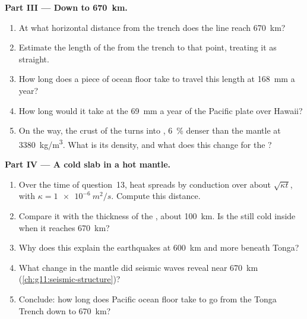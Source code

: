 \begin{problem}
\medskip
\noindent\textbf{Part III --- Down to \qty{670}{km}.}
\begin{enumerate}[resume]
  \item At what horizontal distance from the trench does the line reach
        \qty{670}{km}?
  \item Estimate the length of the  from the trench to that point,
        treating it as straight.
  \item How long does a piece of ocean floor take to travel this length at
        \qty{168}{mm} a year?
  \item How long would it take at the \qty{69}{mm} a year of the Pacific
        plate over Hawaii?
  \item On the way, the crust of the  turns into ,
        \qty{6}{\percent} denser than the mantle at \qty{3380}{kg/m^3}. What
        is its density, and what does this change for the ?
\end{enumerate}

\medskip
\noindent\textbf{Part IV --- A cold slab in a hot mantle.}
\begin{enumerate}[resume]
  \item Over the time of question~13, heat spreads by conduction over about
        $\sqrt{\kappa t}$, with $\kappa = \qty{1e-6}{m^2/s}$. Compute this
        distance.
  \item Compare it with the thickness of the , about \qty{100}{km}. Is
        the  still cold inside when it reaches \qty{670}{km}?
  \item Why does this explain the earthquakes at \qty{600}{km} and more
        beneath Tonga?
  \item What change in the mantle did seismic waves reveal near
        \qty{670}{km} (\cref{ch:g11:seismic-structure})?
  \item Conclude: how long does Pacific ocean floor take to go from the Tonga
        Trench down to \qty{670}{km}?
\end{enumerate}
\end{problem}
